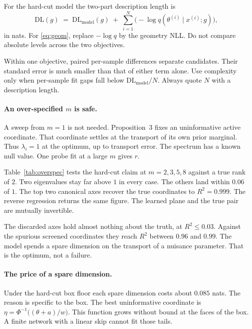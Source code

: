 \documentclass[11pt, letterpaper]{article}
\theoremstyle{definition}
\begin{document}
For the hard-cut model the two-part description length is
\begin{equation}
  \mathrm{DL}(g) \;=\; \mathrm{DL}_{\mathrm{model}}(g)
  \;+\;\sum_{i=1}^{N}\bigl(-\log q(\theta^{(i)}\mid x^{(i)};g)\bigr),
  \label{eq:mdl}
\end{equation}
in nats. For \eqref{eq:geom}, replace $-\log q$ by the geometry NLL.
Do not compare absolute levels across the two objectives.

Within one objective, paired per-sample differences separate candidates.
Their standard error is much smaller than that of either term alone.
Use complexity only when per-sample fit gaps fall below
$\mathrm{DL}_{\mathrm{model}}/N$. Always quote $N$ with a description length.

\paragraph{An over-specified $m$ is safe.}
A sweep from $m=1$ is not needed.
Proposition~3 fixes an uninformative active coordinate.
That coordinate settles at the transport of its own prior marginal.
Thus $\lambda_i=1$ at the optimum, up to transport error.
The spectrum has a known null value.
One probe fit at a large $m$ gives $r$.

Table~\ref{tab:overspec} tests the hard-cut claim at $m=2,3,5,8$ against a
true rank of $2$. Two eigenvalues stay far above $1$ in every case.
The others land within $0.06$ of $1$.
The top two canonical axes recover the true coordinates to $R^2=0.999$.
The reverse regression returns the same figure.
The learned plane and the true pair are mutually invertible.

The discarded axes hold almost nothing about the truth, at $R^2\le0.03$.
Against the spurious screened coordinates they reach $R^2$ between $0.96$ and
$0.99$. The model spends a spare dimension on the transport of a nuisance
parameter. That is the optimum, not a failure.

\paragraph{The price of a spare dimension.}
Under the hard-cut box floor each spare dimension costs about $0.085$ nats.
The reason is specific to the box.
The best uninformative coordinate is
$\eta=\Phi^{-1}\bigl((\theta+a)/w\bigr)$.
This function grows without bound at the faces of the box.
A finite network with a linear skip cannot fit those tails.
\end{document}
